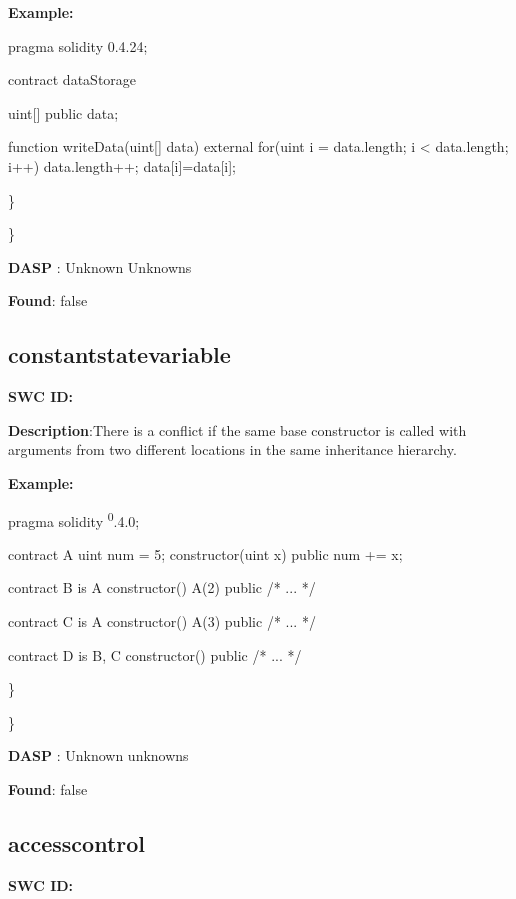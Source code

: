 \documentclass{article}
\begin{document}
{{\textbf{Example:} 

pragma solidity 0.4.24;

contract dataStorage {
    uint[] public data;

    function writeData(uint[] \textunderscore data) external {
        for(uint i = data.length; i < \textunderscore data.length; i++) {
            data.length++;
            data[i]=\textunderscore data[i];
        }
    }
}

\} 

\} 

\textbf{DASP} : Unknown Unknowns

\textbf{Found}: false

\subsection{constant\textunderscore state\textunderscore variable} 
\textbf{SWC \textunderscore ID:} 

\textbf{Description}:There is a conflict if the same base constructor is called with arguments from two different locations in the same inheritance hierarchy.


\textbf{Example:} 

pragma solidity \textsuperscript0.4.0;

contract A{
    uint num = 5;
    constructor(uint x) public{
        num += x;
    }
}

contract B is A{
    constructor() A(2) public { /* ... */ }
}

contract C is A {
    constructor() A(3) public { /* ... */ }
}

contract D is B, C {
    constructor() public { /* ... */ }
}

\} 

\} 

\textbf{DASP} : Unknown unknowns

\textbf{Found}: false

\subsection{access\textunderscore control} 
\textbf{SWC \textunderscore ID:} 

}}
\end{document}
